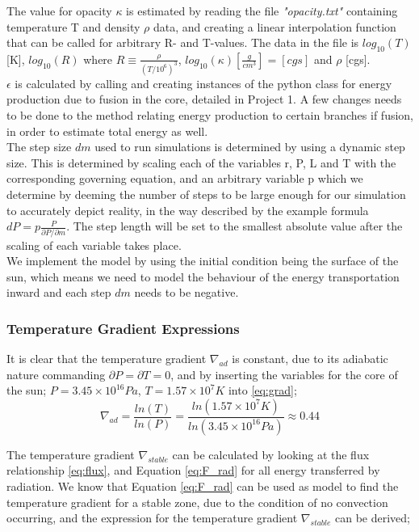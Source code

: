 \documentclass[10pt, nofootinbib, twocolumn]{revtex4-1}
\begin{document}
The value for opacity $\kappa$ is estimated by reading the file \textit{"opacity.txt"} containing temperature T and density $\rho$ data, and creating a linear interpolation function that can be called for arbitrary R- and T-values. The data in the file is $log_{10}(T)$ [K], $log_{10}(R)$ where $R\equiv\frac{\rho}{(T/10^6)^3}$, $log_{10}(\kappa) [\frac{g}{cm^3}]=[cgs]$ and $\rho$ [cgs]. \\

$\epsilon$ is calculated by calling and creating instances of the python class for energy production due to fusion in the core, detailed in Project 1. A few changes needs to be done to the method relating energy production to certain branches if fusion, in order to estimate total energy as well. \\

The step size $dm$ used to run simulations is determined by using a dynamic step size. This is determined by scaling each of the variables r, P, L and T with the corresponding governing equation, and an arbitrary variable p which we determine by deeming the number of steps to be large enough for our simulation to accurately depict reality, in the way described by the example formula $dP=p\frac{P}{\partial P/\partial m}$. The step length will be set to the smallest absolute value after the scaling of each variable takes place. \\

We implement the model by using the initial condition being the surface of the sun, which means we need to model the behaviour of the energy transportation inward and each step $dm$ needs to be negative. \\

\subsubsection{Temperature Gradient Expressions}
It is clear that the temperature gradient $\nabla_{ad}$ is constant, due to its adiabatic nature commanding $\partial P = \partial T = 0$, and by inserting the variables for the core of the sun; $P=3.45\times10^{16}Pa$, $T=1.57\times10^7K$ into \eqref{eq:grad}; 
$$\nabla_{ad}=\frac{ln(T)}{ln(P)}=\frac{ln(1.57\times10^7K)}{ln(3.45\times10^{16}Pa)}\approx 0.44$$

The temperature gradient $\nabla_{stable}$ can be calculated by looking at the flux relationship \eqref{eq:flux}, and Equation \eqref{eq:F_rad} for all energy transferred by radiation. We know that Equation \eqref{eq:F_rad} can be used as model to find the temperature gradient for a stable zone, due to the condition of no convection occurring, %
and the expression for the temperature gradient $\nabla_{stable}$ can be derived;
\end{document}

